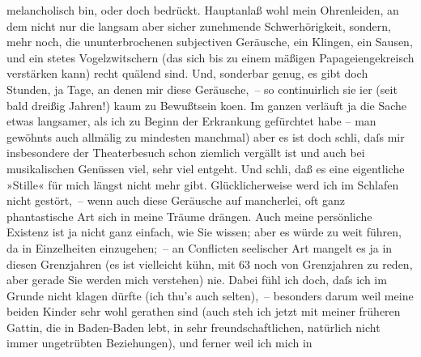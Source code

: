 \begin{ledgroupsized}[t]{13cm}
               melancholisch bin, oder doch bedrückt. Hauptanlaß wohl mein Ohrenleiden, an dem nicht
               nur die langsam aber sicher zunehmende Schwerhörigkeit, sondern, mehr noch, die
               ununterbrochenen subjectiven Geräusche, ein Klingen, ein Sausen, und ein \strikeout{\textcolor{gray}{nicht}} stetes Vogelzwitschern (das sich bis zu einem mäßigen Papageiengekreisch
               verstärken kann) recht quälend sind. Und, sonderbar genug, es gibt doch Stunden, ja
               Tage, an denen mir diese Geräusche, – so continuirlich sie i{\geminationm}er (seit bald dreißig Jahren!) kaum zu Bewußtsein ko{\geminationm}en. Im ganzen verläuft ja die Sache etwas langsamer,
               als ich zu Beginn der Erkrankung gefürchtet habe – man gewöhnts auch allmälig \label{T_L02444-1v}\label{T_L02444-1h}zu mindesten manchmal) aber es ist doch schli{\geminationm}, daſs mir insbesondere der Theaterbesuch schon
               ziemlich vergällt ist und auch bei musikalischen Genüssen viel, sehr viel entgeht.
               Und schli{\geminationm}, {\pb}daß es
               eine eigentliche »Stille« für mich längst nicht mehr gibt. Glücklicherweise werd ich
               im Schlafen nicht gestört, – wenn auch diese Geräusche auf mancherlei, oft ganz
               phantastische Art sich in meine Träume drängen.\pend
           \pstart
           Auch meine persönliche Existenz ist ja nicht ganz einfach, wie Sie wissen; aber es
               würde zu weit führen, da in Einzelheiten einzugehen; – an Conflicten seelischer Art
               mangelt es ja in diesen Grenzjahren (es ist vielleicht kühn, mit 63 noch von
               Grenzjahren zu reden, aber gerade Sie werden mich verstehen) nie.\pend
           \pstart
           Dabei fühl ich doch, daſs ich im Grunde nicht klagen dürfte (ich thu’s auch
               selten), – besonders darum weil meine beiden Kinder sehr wohl gerathen sind
               (auch steh ich jetzt mit meiner früheren Gattin, die in Baden-Baden lebt, in sehr freundschaftlichen, natürlich nicht immer unge{\pb}trübten Beziehungen), und ferner weil ich mich in

\end{ledgroupsized}
